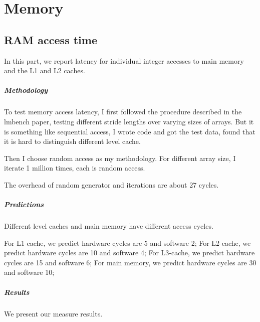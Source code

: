 \chapter{Memory}

\section{RAM access time}
In this part, we report latency for individual integer accesses to main memory and the L1 and L2 caches.

\paragraph{Methodology}
To test memory access latency, I first followed the procedure described in the lmbench paper, testing different stride lengths over varying sizes of arrays. But it is something like sequential access, I wrote code and got the test data, found that it is hard to distinguish different level cache.

Then I choose random access as my methodology. For different array size, I iterate 1 million times, each is random access.

The overhead of random generator and iterations are about  27 cycles.

\paragraph{Predictions}
Different level caches and main memory have different access cycles.

For L1-cache, we predict hardware cycles are 5 and software 2;
For L2-cache, we predict hardware cycles are 10 and software 4;
For L3-cache, we predict hardware cycles are 15 and software 6;
For main memory, we predict hardware cycles are 30 and software 10;

\paragraph{Results}
We present our measure results.

